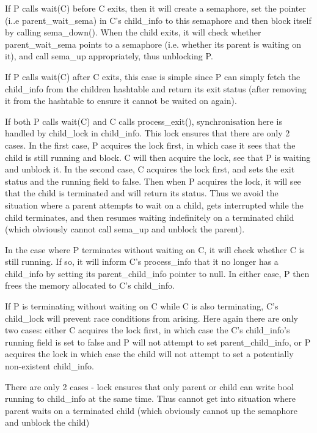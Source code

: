 If P calls wait(C) before C exits, then it will create a semaphore, set the pointer (i..e parent\_wait\_sema) in C's child\_info to this semaphore and then block itself by calling sema\_down(). When the child exits, it will check whether parent\_wait\_sema points to a semaphore (i.e. whether its parent is waiting on it), and call sema\_up appropriately, thus unblocking P.

If P calls wait(C) after C exits, this case is simple since P can simply fetch the child\_info from the children hashtable and return its exit status (after removing it from the hashtable to ensure it cannot be waited on again).

If both P calls wait(C) and C calls process\_exit(), synchronisation here is handled by child\_lock in child\_info. This lock ensures that there are only 2 cases. In the first case, P acquires the lock first, in which case it sees that the child is still running and block. C will then acquire the lock, see that P is waiting and unblock it. In the second case, C acquires the lock first, and sets the exit status and the running field to false. Then when P acquires the lock, it will see that the child is terminated and will return its status. Thus we avoid the situation where a parent attempts to wait on a child, gets interrupted while the child terminates, and then resumes waiting indefinitely on a terminated child (which obviously cannot call sema\_up and unblock the parent).

In the case where P terminates without waiting on C, it will check whether C is still running. If so, it will inform C's process\_info that it no longer has a child\_info by setting its parent\_child\_info pointer to null. In either case, P then frees the memory allocated to C's child\_info.

If P is terminating without waiting on C while C is also terminating, C's child\_lock will prevent race conditions from arising. Here again there are only two cases: either C acquires the lock first, in which case the C's child\_info's running field is set to false and P will not attempt to set parent\_child\_info, or P acquires the lock in which case the child will not attempt to set a potentially non-existent child\_info.

There are only 2 cases - lock ensures that only parent or child can write bool running to child\_info at the same time. Thus cannot get into situation where parent waits on a terminated child (which obviously cannot up the semaphore and unblock the child)

